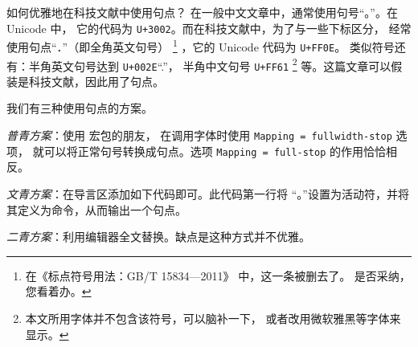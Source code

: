 \begin{myQA}{如何优雅地在科技文献中使用句点？}
	在一般中文文章中，通常使用句号“{。}”。在 Unicode 中，
	它的代码为 \verb|U+3002|。而在科技文献中，为了与一些下标区分，
	经常使用句点“．”（即全角英文句号）
	\footnote{在《标点符号用法：GB/T 15834—2011》 中，这一条被删去了。
		是否采纳，您看着办。}
	，它的 Unicode 代码为 \verb|U+FF0E|。
	类似符号还有：半角英文句号达到 \verb|U+002E|“.”，
	半角中文句号 \verb|U+FF61|
	\footnote{本文所用字体并不包含该符号，可以脑补一下，
		或者改用微软雅黑等字体来显示。}
	等。这篇文章可以假装是科技文献，因此用了句点。
	
	我们有三种使用句点的方案。
	
	\emph{普青方案}：使用   宏包的朋友，
	在调用字体时使用
	\verb|Mapping = fullwidth-stop|  选项，
	就可以将正常句号转换成句点。选项 \verb|Mapping = full-stop|
	的作用恰恰相反。
	
	\emph{文青方案}：在导言区添加如下代码即可。此代码第一行将
	“{。}”设置为活动符，并将其定义为命令，从而输出一个句点。
	 
	
	\emph{二青方案}：利用编辑器全文替换。缺点是这种方式并不优雅。
	
\end{myQA}

